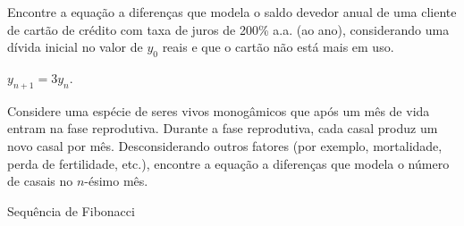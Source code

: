 \begin{exer}
  Encontre a equação a diferenças que modela o saldo devedor anual de uma cliente de cartão de crédito com taxa de juros de 200\% a.a. (ao ano), considerando uma dívida inicial no valor de $y_0$ reais e que o cartão não está mais em uso.
\end{exer}
\begin{resp}
  $y_{n+1} = 3y_n$.
\end{resp}

\begin{exer}
  Considere uma espécie de seres vivos monogâmicos que após um mês de vida entram na fase reprodutiva. Durante a fase reprodutiva, cada casal produz um novo casal por mês. Desconsiderando outros fatores (por exemplo, mortalidade, perda de fertilidade, etc.), encontre a equação a diferenças que modela o número de casais no $n$-ésimo mês. 
\end{exer}
\begin{resp}
  Sequência de Fibonacci
\end{resp}

